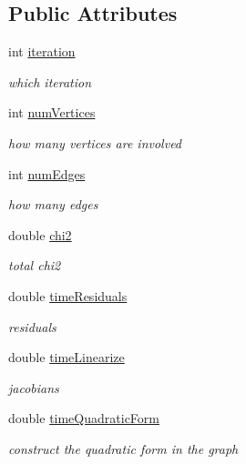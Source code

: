 \subsection*{Public Attributes}
\begin{DoxyCompactItemize}
\item 
int \hyperlink{structg2o_1_1G2OBatchStatistics_a63e30077b9dad65c321b322a2a6f0aea}{iteration}
\begin{DoxyCompactList}\small\item\em which iteration \end{DoxyCompactList}\item 
int \hyperlink{structg2o_1_1G2OBatchStatistics_a2a3ecd684cb9e60c34afeee0d8f35d23}{num\+Vertices}
\begin{DoxyCompactList}\small\item\em how many vertices are involved \end{DoxyCompactList}\item 
int \hyperlink{structg2o_1_1G2OBatchStatistics_ae8924cd0e0e7fee183cba73b706eb5a5}{num\+Edges}
\begin{DoxyCompactList}\small\item\em how many edges \end{DoxyCompactList}\item 
double \hyperlink{structg2o_1_1G2OBatchStatistics_a719152d550dd4fe3300d06558fe0a6d5}{chi2}
\begin{DoxyCompactList}\small\item\em total chi2 \end{DoxyCompactList}\item 
double \hyperlink{structg2o_1_1G2OBatchStatistics_a1815f0fb0a84cd1977d72c83cefdb76b}{time\+Residuals}
\begin{DoxyCompactList}\small\item\em residuals \end{DoxyCompactList}\item 
double \hyperlink{structg2o_1_1G2OBatchStatistics_ac288190f875b8777b3c24c860a3741d7}{time\+Linearize}
\begin{DoxyCompactList}\small\item\em jacobians \end{DoxyCompactList}\item 
double \hyperlink{structg2o_1_1G2OBatchStatistics_af949afd7e25ceef08379220ed242aa36}{time\+Quadratic\+Form}
\begin{DoxyCompactList}\small\item\em construct the quadratic form in the graph \end{DoxyCompactList}\item 

\end{DoxyCompactItemize}
